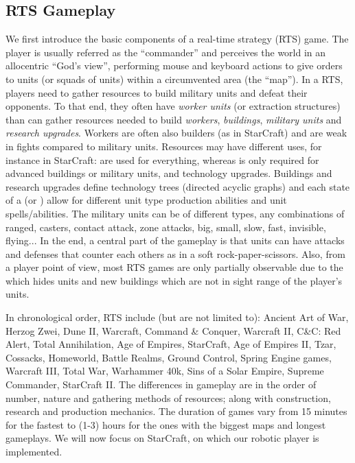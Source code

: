 \subsection{RTS Gameplay}
\label{sec:rtsgameplay}
We first introduce the basic components of a real-time strategy (RTS) game. The player is usually referred as the ``commander'' and perceives the world in an allocentric ``God's view'', performing mouse and keyboard actions to give orders to units (or squads of units) within a circumvented area (the ``map''). In a RTS, players need to gather resources to build military units and defeat their opponents. To that end, they often have \textit{worker units} (or extraction structures) than can gather resources needed to build \textit{workers}, \textit{buildings}, \textit{military units} and \textit{research upgrades}. Workers are often also builders (as in StarCraft) and are weak in fights compared to military units. Resources may have different uses, for instance in StarCraft:  are used for everything, whereas  is only required for advanced buildings or military units, and technology upgrades. Buildings and research upgrades define technology trees (directed acyclic graphs) and each state of a 
 (or ) allow for different unit type production abilities and unit spells/abilities. The military units can be of different types, any combinations of ranged, casters, contact attack, zone attacks, big, small, slow, fast, invisible, flying... In the end, a central part of the gameplay is that units can have attacks and defenses that counter each others as in a soft rock-paper-scissors. Also, from a player point of view, most RTS games are only partially observable due to the \textit{} which hides units and new buildings which are not in sight range of the player's units. 


In chronological order, RTS include (but are not limited to): Ancient Art of War, Herzog Zwei, Dune II, Warcraft, Command \& Conquer, Warcraft II, C\&C: Red Alert, Total Annihilation, Age of Empires, StarCraft, Age of Empires II, Tzar, Cossacks, Homeworld, Battle Realms, Ground Control, Spring Engine games, Warcraft III, Total War, Warhammer 40k, Sins of a Solar Empire, Supreme Commander, StarCraft II. The differences in gameplay are in the order of number, nature and gathering methods of resources; along with construction, research and production mechanics. The duration of games vary from 15 minutes for the fastest to (1-3) hours for the ones with the biggest maps and longest gameplays. We will now focus on StarCraft, on which our robotic player is implemented.


